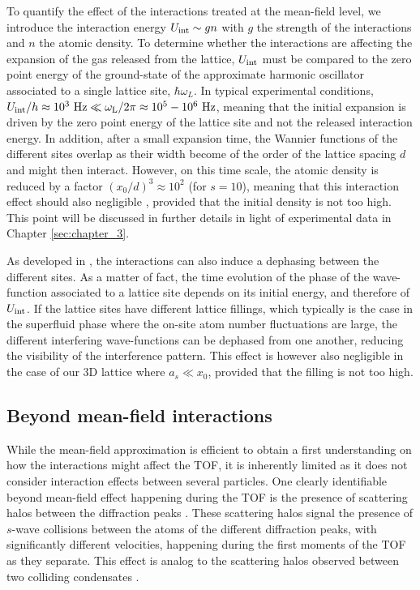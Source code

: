 To quantify the effect of the interactions treated at the mean-field level, we introduce the interaction energy $U_{\rm{int}} \sim gn$ with $g$ the strength of the interactions and $n$ the atomic density. To determine whether the interactions are affecting the expansion of the gas released from the lattice, $U_{\rm{int}}$ must be compared to the zero point energy of the ground-state of the approximate harmonic oscillator associated to a single lattice site, $\hbar \omega_L$. In typical experimental conditions, $U_{\rm{int}}/h \approx 10^3 \ \rm{Hz} \ll \omega_L/2 \pi \approx 10^5-10^6 \ \rm{Hz}$, meaning that the initial expansion is driven by the zero point energy of the lattice site and not the released interaction energy. In addition, after a small expansion time, the Wannier functions of the different sites overlap as their width become of the order of the lattice spacing $d$ and might then interact. However, on this time scale, the atomic density is reduced by a factor $(x_0/d)^3 \approx 10^2$ (for $s=10$), meaning that this interaction effect should also negligible \cite{gerbier2008expansion}, provided that the initial density is not too high. This point will be discussed in further details in light of experimental data in Chapter \ref{sec:chapter_3}.

As developed in \cite{kupferschmidt2010role}, the interactions can also induce a dephasing between the different sites. As a matter of fact, the time evolution of the phase of the wave-function associated to a lattice site depends on its initial energy, and therefore of $U_{\rm{int}}$. If the lattice sites have different lattice fillings, which typically is the case in the superfluid phase where the on-site atom number fluctuations are large, the different interfering wave-functions can be dephased from one another, reducing the visibility of the interference pattern. This effect is however also negligible \cite{gerbier2008expansion,kupferschmidt2010role} in the case of our 3D lattice where $a_s \ll x_0$, provided that the filling is not too high.

\subsection{Beyond mean-field interactions}

While the mean-field approximation is efficient to obtain a first understanding on how the interactions might affect the TOF, it is inherently limited as it does not consider interaction effects between several particles. One clearly identifiable beyond mean-field effect happening during the TOF is the presence of scattering halos between the diffraction peaks \cite{greiner2001exploring}. These scattering halos signal the presence of $s$-wave collisions between the atoms of the different diffraction peaks, \ie with significantly different velocities, happening during the first moments of the TOF as they separate. This effect is analog to the scattering halos observed between two colliding condensates \cite{khakimov2016ghost,perrin2007observation,zin2006elastic}.

